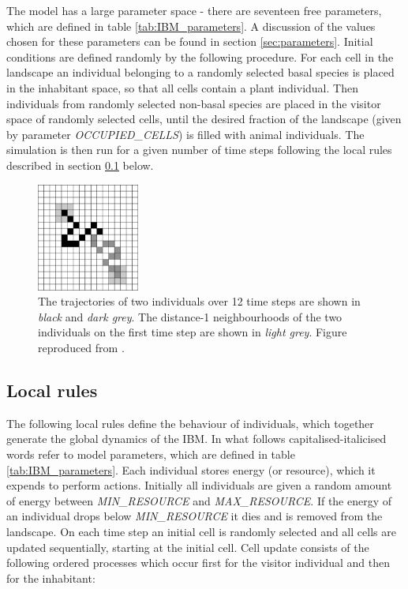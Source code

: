 

The model has a large parameter space - there are seventeen free parameters, which are defined in table \ref{tab:IBM_parameters}. A discussion of the values chosen for these parameters can be found in section \ref{sec:parameters}. Initial conditions are defined randomly by the following procedure. For each cell in the landscape an individual belonging to a randomly selected basal species is placed in the inhabitant space, so that all cells contain a plant individual. Then individuals from randomly selected non-basal species are placed in the visitor space of randomly selected cells, until the desired fraction of the landscape (given by parameter \emph{OCCUPIED\_CELLS}) is filled with animal individuals. The simulation is then run for a given number of time steps following the local rules described in section \ref{sec:CA_rules} below.



\begin{figure}
	\centering
	\includegraphics[width=0.3\textwidth]{"diagrams/IBM_movement"}
	\caption{The trajectories of two individuals over 12 time steps are shown in \emph{black} and \emph{dark grey}. The distance-1 neighbourhoods of the two individuals on the first time step are shown in \emph{light grey}. Figure reproduced from \cite{lurgi2015effects}.}
	\label{fig:IBM_motion}
\end{figure}


\subsection{Local rules}
\label{sec:CA_rules}

The following local rules define the behaviour of individuals, which together generate the global dynamics of the IBM. In what follows capitalised-italicised words refer to model parameters, which are defined in table \ref{tab:IBM_parameters}. Each individual stores energy (or resource), which it expends to perform actions. Initially all individuals are given a random amount of energy between \emph{MIN\_RESOURCE} and \emph{MAX\_RESOURCE}. If the energy of an individual drops below \emph{MIN\_RESOURCE} it dies and is removed from the landscape. On each time step an initial cell is randomly selected and all cells are updated sequentially, starting at the initial cell. Cell update consists of the following ordered processes which occur first for the visitor individual and then for the inhabitant:

